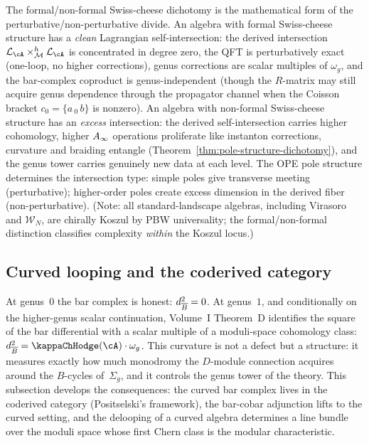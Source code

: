 \begin{remark}
\label{rem:koszul-perturbative-watershed}
The formal/non-formal Swiss-cheese dichotomy is the mathematical form
of the perturbative/non-perturbative divide. An algebra with formal
Swiss-cheese structure has a \emph{clean} Lagrangian
self-intersection: the derived intersection
$\cL_\cA \times_\cM^h \cL_\cA$ is concentrated in degree zero, the
QFT is perturbatively exact (one-loop, no higher corrections), genus
corrections are scalar multiples of $\omega_g$, and the bar-complex
coproduct is genus-independent (though the $R$-matrix may still
acquire genus dependence through the propagator channel when the
Coisson bracket $c_0 = \{a\,{}_0\,b\}$ is nonzero).
An algebra with non-formal Swiss-cheese structure has an \emph{excess}
intersection: the derived self-intersection carries higher cohomology,
higher $A_\infty$ operations proliferate like instanton corrections,
curvature and braiding entangle
(Theorem~\ref{thm:pole-structure-dichotomy}), and the genus tower
carries genuinely new data at each level. The OPE pole structure
determines the intersection type: simple poles give transverse meeting
(perturbative); higher-order poles create excess dimension in the
derived fiber (non-perturbative).
(Note: all standard-landscape algebras, including Virasoro and
$\mathcal{W}_N$, are chirally Koszul by PBW universality;
the formal/non-formal distinction classifies complexity
\emph{within} the Koszul locus.)
\end{remark}

\subsection{Curved looping and the coderived category}
\label{subsec:curved-looping-coderived}

At genus~$0$ the bar complex is honest: $d_{\overline{B}}^2 = 0$.
At genus~$1$, and conditionally on the higher-genus scalar
continuation, Volume~I Theorem~D identifies the square of the
bar differential with a scalar multiple of a moduli-space
cohomology class: $d_{\barB}^2 = \kappaChHodge(\cA) \cdot \omega_g$.
This curvature is not a defect but
a structure: it measures exactly how much monodromy the
$D$-module connection acquires around the $B$-cycles
of~$\Sigma_g$, and it controls the genus tower of the theory.
This subsection develops the consequences: the
curved bar complex lives in the coderived category (Positselski's
framework), the bar-cobar
adjunction lifts to the curved setting, and the delooping of a
curved algebra determines a line bundle over the moduli space whose
first Chern class is the modular characteristic.


